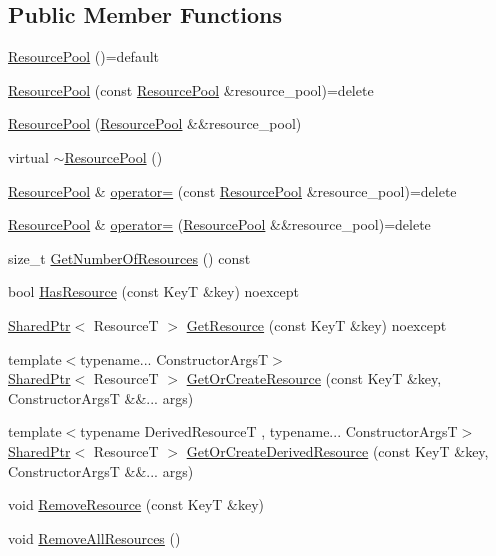 \subsection*{Public Member Functions}
\begin{DoxyCompactItemize}
\item 
\hyperlink{classmage_1_1_resource_pool_a94aff142869744ed48fb1b426face48b}{Resource\+Pool} ()=default
\item 
\hyperlink{classmage_1_1_resource_pool_a82253c9c4adfc120a813dfe811dd5e91}{Resource\+Pool} (const \hyperlink{classmage_1_1_resource_pool}{Resource\+Pool} \&resource\+\_\+pool)=delete
\item 
\hyperlink{classmage_1_1_resource_pool_adf8c262e3fb0c01c8efb9650bf05951b}{Resource\+Pool} (\hyperlink{classmage_1_1_resource_pool}{Resource\+Pool} \&\&resource\+\_\+pool)
\item 
virtual \hyperlink{classmage_1_1_resource_pool_ae4fff3d951818d417f77965c2db265f6}{$\sim$\+Resource\+Pool} ()
\item 
\hyperlink{classmage_1_1_resource_pool}{Resource\+Pool} \& \hyperlink{classmage_1_1_resource_pool_ae8121e031efe9f98605e478b01b19d33}{operator=} (const \hyperlink{classmage_1_1_resource_pool}{Resource\+Pool} \&resource\+\_\+pool)=delete
\item 
\hyperlink{classmage_1_1_resource_pool}{Resource\+Pool} \& \hyperlink{classmage_1_1_resource_pool_a1c0c196460508108435c227c11a65b94}{operator=} (\hyperlink{classmage_1_1_resource_pool}{Resource\+Pool} \&\&resource\+\_\+pool)=delete
\item 
size\+\_\+t \hyperlink{classmage_1_1_resource_pool_ae2f9964a1821c9b8cb38303a5a88c98e}{Get\+Number\+Of\+Resources} () const
\item 
bool \hyperlink{classmage_1_1_resource_pool_a77d614ec79c615fc365474ef7c8c0e6f}{Has\+Resource} (const KeyT \&key) noexcept
\item 
\hyperlink{namespacemage_a1e01ae66713838a7a67d30e44c67703e}{Shared\+Ptr}$<$ ResourceT $>$ \hyperlink{classmage_1_1_resource_pool_ad1d85cf6c36d992d4192118abbead349}{Get\+Resource} (const KeyT \&key) noexcept
\item 
{\footnotesize template$<$typename... Constructor\+ArgsT$>$ }\\\hyperlink{namespacemage_a1e01ae66713838a7a67d30e44c67703e}{Shared\+Ptr}$<$ ResourceT $>$ \hyperlink{classmage_1_1_resource_pool_a5290731a0083d8253330cd40f6304d2c}{Get\+Or\+Create\+Resource} (const KeyT \&key, Constructor\+ArgsT \&\&... args)
\item 
{\footnotesize template$<$typename Derived\+ResourceT , typename... Constructor\+ArgsT$>$ }\\\hyperlink{namespacemage_a1e01ae66713838a7a67d30e44c67703e}{Shared\+Ptr}$<$ ResourceT $>$ \hyperlink{classmage_1_1_resource_pool_a63bfe534b77e11798bfd301512c99f05}{Get\+Or\+Create\+Derived\+Resource} (const KeyT \&key, Constructor\+ArgsT \&\&... args)
\item 
void \hyperlink{classmage_1_1_resource_pool_a56680a516f219bcf69bf5c8aaebdfeed}{Remove\+Resource} (const KeyT \&key)
\item 
void \hyperlink{classmage_1_1_resource_pool_a83a33e15bd8f326d0ebc11b3f8e52a41}{Remove\+All\+Resources} ()
\end{DoxyCompactItemize}

